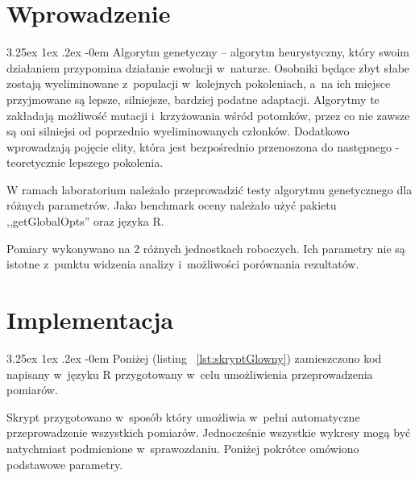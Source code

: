 \documentclass[11pt, a4paper]{article}
\date{\today}
\makeatletter
\newcommand{\fbi}{\leavevmode{\parindent=1em\indent}}
\renewcommand\paragraph{\@startsection{paragraph}{5}{\z@}
  {3.25ex \@plus1ex \@minus.2ex}
  {-0em}
  {\normalfont\normalsize\bfseries}}
\makeatother
\begin{document}


\tableofcontents

\newpage
\section{Wprowadzenie}
\paragraph{}
Algorytm genetyczny – algorytm heurystyczny, który swoim działaniem przypomina działanie ewolucji w~naturze. Osobniki będące zbyt słabe zostają wyeliminowane z~populacji w~kolejnych pokoleniach, a~na ich miejsce przyjmowane są lepsze, silniejsze, bardziej podatne adaptacji. Algorytmy te zakładają możliwość mutacji i~krzyżowania wśród potomków, przez co nie zawsze są oni silniejsi od poprzednio wyeliminowanych członków. Dodatkowo wprowadzają pojęcie elity, która jest bezpośrednio przenoszona do następnego - teoretycznie lepszego pokolenia.

\fbi
W ramach laboratorium należało przeprowadzić testy algorytmu genetycznego dla różnych parametrów. Jako benchmark oceny należało użyć pakietu ,,getGlobalOpts'' oraz języka R.

\fbi
Pomiary wykonywano na 2 różnych jednostkach roboczych. Ich parametry nie są istotne z~punktu widzenia analizy i~możliwości porównania rezultatów.

\section{Implementacja}
\paragraph{}
Poniżej (listing ~\ref{lst:skryptGlowny}) zamieszczono kod napisany w~języku R przygotowany w~celu umożliwienia przeprowadzenia pomiarów.



\fbi
Skrypt przygotowano w~sposób który umożliwia w~pełni automatyczne przeprowadzenie wszystkich pomiarów. Jednocześnie wszystkie wykresy mogą być natychmiast podmienione w~sprawozdaniu. Poniżej pokrótce omówiono podstawowe parametry.
\end{document}
